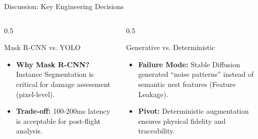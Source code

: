 \documentclass{beamer}
\begin{document}
\begin{frame}{Discussion: Key Engineering Decisions}
    \begin{columns}
        \begin{column}{0.5\linewidth}
            \begin{block}{Mask R-CNN vs. YOLO}
                \begin{itemize}
                    \item \textbf{Why Mask R-CNN?} Instance Segmentation is critical for damage assessment (pixel-level).
                    \item \textbf{Trade-off:} 100-200ms latency is acceptable for post-flight analysis.
                \end{itemize}
            \end{block}
        \end{column}
        \begin{column}{0.5\linewidth}
            \begin{block}{Generative vs. Deterministic}
                \begin{itemize}
                    \item \textbf{Failure Mode:} Stable Diffusion generated ``noise patterns'' instead of semantic nest features (Feature Leakage).
                    \item \textbf{Pivot:} Deterministic augmentation ensures physical fidelity and traceability.
                \end{itemize}
            \end{block}
        \end{column}
    \end{columns}
\end{frame}
\end{document}
